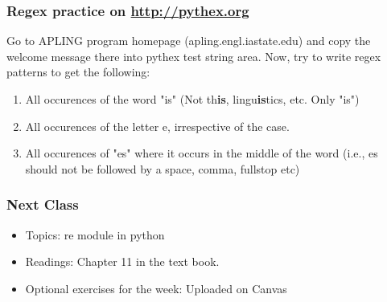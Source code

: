 \documentclass{beamer}
\begin{document}
\begin{frame}
\frametitle{Regex practice on \url{http://pythex.org}}
Go to APLING program homepage (apling.engl.iastate.edu) and copy the welcome message there into pythex test string area. Now, try to write regex patterns to get the following:

\begin{enumerate}
\item All occurences of the word "is" (Not th\textbf{is}, lingu\textbf{is}tics, etc. Only "is")
\item All occurences of the letter e, irrespective of the case. 
\item All occurences of "es" where it occurs in the middle of the word (i.e., es should not be followed by a space, comma, fullstop etc)
\end{enumerate}
\end{frame}

\begin{frame}
\frametitle{Next Class}
\begin{itemize}
\item Topics: re module in python
\item Readings: Chapter 11 in the text book.
\item Optional exercises for the week: Uploaded on Canvas
\end{itemize}
\end{frame}
\end{document}
